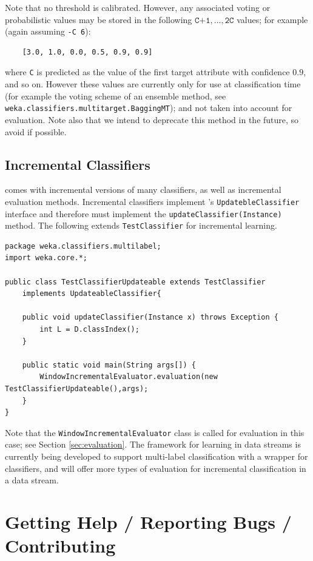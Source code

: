 \documentclass[11pt]{article}
\newcommand{\MEKA}{Meka}
\newcommand{\MOA}{Moa}
\newcommand{\WEKA}{Weka}
\begin{document}
Note that no threshold is calibrated. However, any associated voting or probabilistic values may be stored in the following $\texttt{C+1},\ldots,\texttt{2C}$ values; for example (again assuming \texttt{-C 6}):
\begin{verbatim}
	[3.0, 1.0, 0.0, 0.5, 0.9, 0.9]
\end{verbatim} 
where \texttt{C} is predicted as the value of the first target attribute with confidence $0.9$, and so on. However these values are currently only for use at classification time (for example the voting scheme of an ensemble method, see \texttt{weka.classifiers.multitarget.BaggingMT}); and not taken into account for evaluation. Note also that we intend to deprecate this method in the future, so avoid if possible.

\subsection{Incremental Classifiers}

\framework{\MEKA} comes with incremental versions of many classifiers, as well as incremental evaluation methods. Incremental classifiers implement \framework{\WEKA}'s \texttt{UpdatebleClassifier} interface and therefore must implement the \texttt{updateClassifier(Instance)} method. The following extends \texttt{TestClassifier} for incremental learning.

{\small
\begin{verbatim}
package weka.classifiers.multilabel;
import weka.core.*;

public class TestClassifierUpdateable extends TestClassifier 
    implements UpdateableClassifier{
	
    public void updateClassifier(Instance x) throws Exception {
        int L = D.classIndex();
    }
    
    public static void main(String args[]) {
        WindowIncrementalEvaluator.evaluation(new TestClassifierUpdateable(),args);
    }
}
\end{verbatim}
}

Note that the \texttt{WindowIncrementalEvaluator} class is called for evaluation in this case; see Section \ref{sec:evaluation}. {\blue The \framework{\MOA} framework \cite{MOA} for learning in data streams is currently being developed to support multi-label classification with a wrapper for \framework{\MEKA} classifiers, and will offer more types of evaluation for incremental classification in a data stream.}

\section{Getting Help / Reporting Bugs / Contributing}
\end{document}
